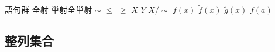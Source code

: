 \documentclass[dvipdfmx,a4paper,11pt]{article}
\theoremstyle{definition}
\begin{document}
\begin{itembox}[l]{語句群}
全射 \quad 単射\quad 全単射 
\quad $\sim$ \quad $\le$ \quad $\ge$
\quad $X$ \quad $Y$ \quad $X /\sim$
\quad $f(x)$ \quad $\widetilde{f}(x)$ \quad $\widetilde{g}(x)$ \quad $f(a)$
\end{itembox}

 

  \newpage


 \begin{center}
\section{整列集合}
\label{sec-7}
\end{center}
\end{document}
